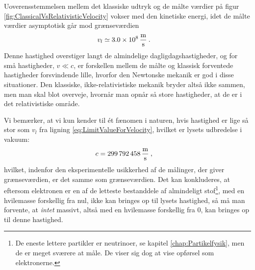 %
Uoverensstemmelsen mellem det klassiske udtryk og de målte værdier på figur \ref{fig:ClassicalVsRelativisticVelocity} vokser med den kinetiske energi, idet de målte værdier asymptotisk går mod grænseværdien
\begin{align} \label{eq:LimitValueForVelocity}
v_l &\simeq \SI{3.0e8}{\frac{\metre}{\second}} \: .
\end{align}
Denne hastighed overstiger langt de almindelige dagligdagshastigheder, og for små hastigheder, $v \ll c$, er forskellen mellem de målte og klassisk forventede hastigheder forsvindende lille, hvorfor den Newtonske mekanik er god i disse situationer. Den klassiske, ikke-relativistiske mekanik bryder altså ikke sammen, men man skal blot overveje, hvornår man opnår så store hastigheder, at de er i det relativistiske område.

Vi bemærker, at vi kun kender til ét fænomen i naturen, hvis hastighed er lige så stor som $v_l$ fra ligning \eqref{eq:LimitValueForVelocity}, hvilket er lysets udbredelse i vakuum:
\begin{align}
c &= \SI{299792458}{\frac{\metre}{\second}} \: ,
\end{align}
hvilket, indenfor den eksperimentelle usikkerhed af de målinger, der giver grænseværdien, er det samme som grænseværdien.
Det kan konkluderes, at eftersom elektronen er en af de letteste bestanddele af almindeligt stof\footnote{De eneste lettere partikler er neutrinoer, se kapitel \ref{chap:Partikelfysik}, men de er meget sværere at måle. De viser sig dog at vise opførsel som elektronerne.}, med en hvilemasse forskellig fra nul, ikke kan bringes op til lysets hastighed, så må man forvente, at \emph{intet} massivt, altså med en hvilemasse forskellig fra $0$, kan bringes op til denne hastighed.